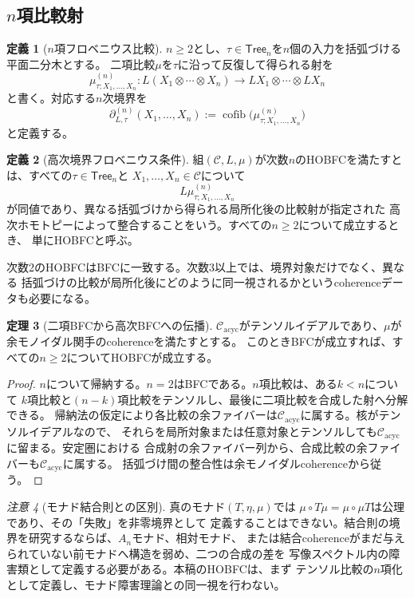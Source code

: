 \documentclass[11pt,a4paper]{ltjsarticle}
\theoremstyle{definition}
\newtheorem{definition}{定義}[section]
\newtheorem{theorem}[definition]{定理}
\theoremstyle{remark}
\newtheorem{remark}[definition]{注意}
\newcommand{\C}{\mathcal{C}}
\newcommand{\Cacyc}{\mathcal{C}_{\mathrm{acyc}}}
\newcommand{\cofib}{\operatorname{cofib}}
\newcommand{\Tree}{\mathsf{Tree}}
\begin{document}
\subsection{\texorpdfstring{$n$項}{n項}比較射}

\begin{definition}[$n$項フロベニウス比較]
$n\geq2$とし、$\tau\in\Tree_n$を$n$個の入力を括弧づける平面二分木とする。
二項比較$\mu$を$\tau$に沿って反復して得られる射を
\[
 \mu^{(n)}_{\tau;X_1,\ldots,X_n}:
 L(X_1\otimes\cdots\otimes X_n)
 \longrightarrow LX_1\otimes\cdots\otimes LX_n
\]
と書く。対応する$n$次境界を
\[
 \partial_{L,\tau}^{(n)}(X_1,\ldots,X_n)
 :=\cofib\bigl(\mu^{(n)}_{\tau;X_1,\ldots,X_n}\bigr)
\]
と定義する。
\end{definition}

\begin{definition}[高次境界フロベニウス条件]
組$(\C,L,\mu)$が次数$n$のHOBFCを満たすとは、すべての$\tau\in\Tree_n$と
$X_1,\ldots,X_n\in\C$について
\[
 L\mu^{(n)}_{\tau;X_1,\ldots,X_n}
\]
が同値であり、異なる括弧づけから得られる局所化後の比較射が指定された
高次ホモトピーによって整合することをいう。すべての$n\geq2$について成立するとき、
単にHOBFCと呼ぶ。
\end{definition}

次数2のHOBFCはBFCに一致する。次数3以上では、境界対象だけでなく、異なる
括弧づけの比較が局所化後にどのように同一視されるかというcoherenceデータも必要になる。

\begin{theorem}[二項BFCから高次BFCへの伝播]
$\Cacyc$がテンソルイデアルであり、$\mu$が余モノイダル関手のcoherenceを満たすとする。
このときBFCが成立すれば、すべての$n\geq2$についてHOBFCが成立する。
\end{theorem}

\begin{proof}
$n$について帰納する。$n=2$はBFCである。$n$項比較は、ある$k<n$について
$k$項比較と$(n-k)$項比較をテンソルし、最後に二項比較を合成した射へ分解できる。
帰納法の仮定により各比較の余ファイバーは$\Cacyc$に属する。核がテンソルイデアルなので、
それらを局所対象または任意対象とテンソルしても$\Cacyc$に留まる。安定圏における
合成射の余ファイバー列から、合成比較の余ファイバーも$\Cacyc$に属する。
括弧づけ間の整合性は余モノイダルcoherenceから従う。
\end{proof}

\begin{remark}[モナド結合則との区別]
真のモナド$(T,\eta,\mu)$では
$\mu\circ T\mu=\mu\circ\mu T$は公理であり、その「失敗」を非零境界として
定義することはできない。結合則の境界を研究するならば、$A_n$モナド、相対モナド、
または結合coherenceがまだ与えられていない前モナドへ構造を弱め、二つの合成の差を
写像スペクトル内の障害類として定義する必要がある。本稿のHOBFCは、まず
テンソル比較の$n$項化として定義し、モナド障害理論との同一視を行わない。
\end{remark}
\end{document}
